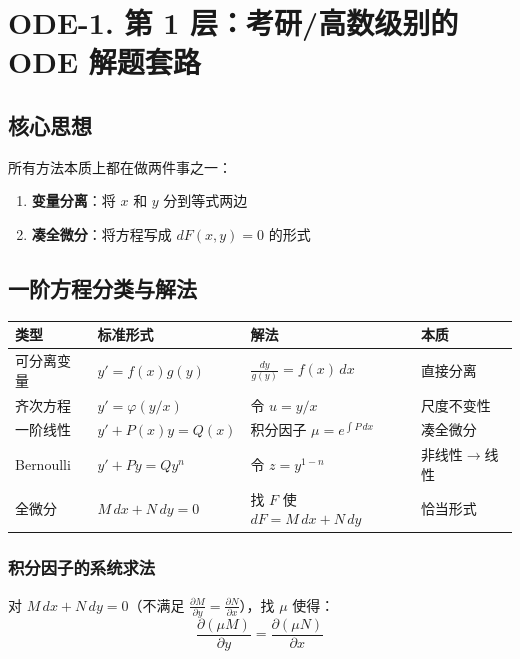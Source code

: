 \section{ODE-1. 第 1 层：考研/高数级别的 ODE 解题套路}

\subsection{核心思想}

所有方法本质上都在做两件事之一：
\begin{enumerate}
  \item \textbf{变量分离}：将 $x$ 和 $y$ 分到等式两边
  \item \textbf{凑全微分}：将方程写成 $dF(x,y) = 0$ 的形式
\end{enumerate}

\subsection{一阶方程分类与解法}

\begin{center}
\begin{tabular}{L{2.5cm}L{4cm}L{4cm}L{3cm}}
\toprule
\textbf{类型} & \textbf{标准形式} & \textbf{解法} & \textbf{本质} \\
\midrule
可分离变量 & $y' = f(x)g(y)$ & $\frac{dy}{g(y)} = f(x)\,dx$ & 直接分离 \\
齐次方程 & $y' = \varphi(y/x)$ & 令 $u = y/x$ & 尺度不变性 \\
一阶线性 & $y' + P(x)y = Q(x)$ & 积分因子 $\mu = e^{\int P\,dx}$ & 凑全微分 \\
Bernoulli & $y' + Py = Qy^n$ & 令 $z = y^{1-n}$ & 非线性$\to$线性 \\
全微分 & $M\,dx + N\,dy = 0$ & 找 $F$ 使 $dF = M\,dx + N\,dy$ & 恰当形式 \\
\bottomrule
\end{tabular}
\end{center}

\subsubsection{积分因子的系统求法}

对 $M\,dx + N\,dy = 0$（不满足 $\frac{\partial M}{\partial y} = \frac{\partial N}{\partial x}$），找 $\mu$ 使得：
\[
\frac{\partial(\mu M)}{\partial y} = \frac{\partial(\mu N)}{\partial x}
\]

